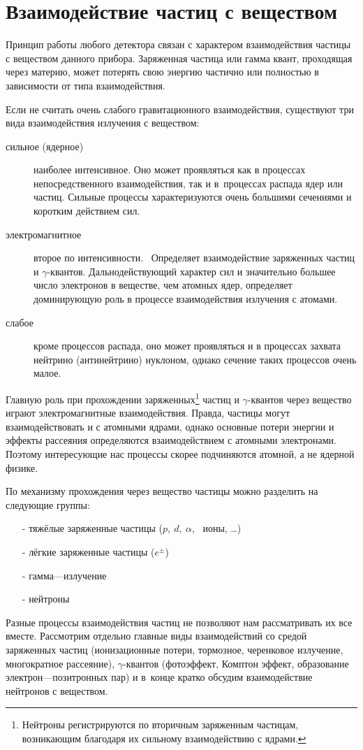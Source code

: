 \section{Взаимодействие частиц с веществом}
Принцип работы любого детектора связан с характером взаимодействия
частицы с веществом данного прибора. Заряженная частица или гамма квант,
проходящая  через материю, может потерять свою энергию частично или
полностью в зависимости от типа взаимодействия.

Если не считать очень слабого гравитационного взаимодействия, существуют
три вида взаимодействия излучения с веществом:
\begin{description}
\item[сильное (ядерное)] наиболее интенсивное. Оно может
  проявляться как в процессах непосредственного взаимодействия, так и
  в~процессах распада ядер или частиц. Сильные процессы характеризуются
  очень большими сечениями и коротким действием сил.
\item[электромагнитное] второе по интенсивности. ~Определяет
  взаимодействие заряженных частиц и $\gamma$-квантов. Дальнодействующий
  характер сил и значительно большее число электронов в веществе, чем
  атомных ядер, определяет доминирующую роль в процессе взаимодействия
  излучения с атомами.
\item[слабое] кроме процессов распада, оно может проявляться и в
  процессах захвата нейтрино (антинейтрино) нуклоном, однако сечение таких
  процессов очень малое.
\end{description}

Главную роль при прохождении заряженных\footnote{Нейтроны
  регистрируются по вторичным заряженным частицам, возникающим благодаря
  их сильному взаимодействию с ядрами.}
частиц и $\gamma$-квантов через вещество играют электромагнитные
взаимодействия. Правда, частицы могут взаимодействовать и с атомными
ядрами, однако основные потери энергии и эффекты рассеяния определяются
взаимодействием с атомными электронами. Поэтому интересующие нас
процессы скорее подчиняются атомной, а не ядерной физике.

По механизму прохождения через вещество частицы можно разделить
на следующие группы:
\begin{itemize}
\item[-] тяжёлые заряженные частицы ($p,~d,~\alpha$,~ ионы, \dots)
\item[-] лёгкие заряженные частицы ($e^\pm$)
\item[-] гамма---излучение
\item[-] нейтроны
\end{itemize}
\clearpage
Разные процессы взаимодействия частиц не позволяют нам рассматривать их
все вместе. Рассмотрим отдельно главные виды взаимодействий со средой
заряженных частиц (ионизационные потери, тормозное, черенковое излучение,
многократное рассеяние), $\gamma$-квантов (фотоэффект, Комптон эффект,
образование электрон---позитронных пар) и в~конце кратко обсудим
взаимодействие нейтронов с веществом.

